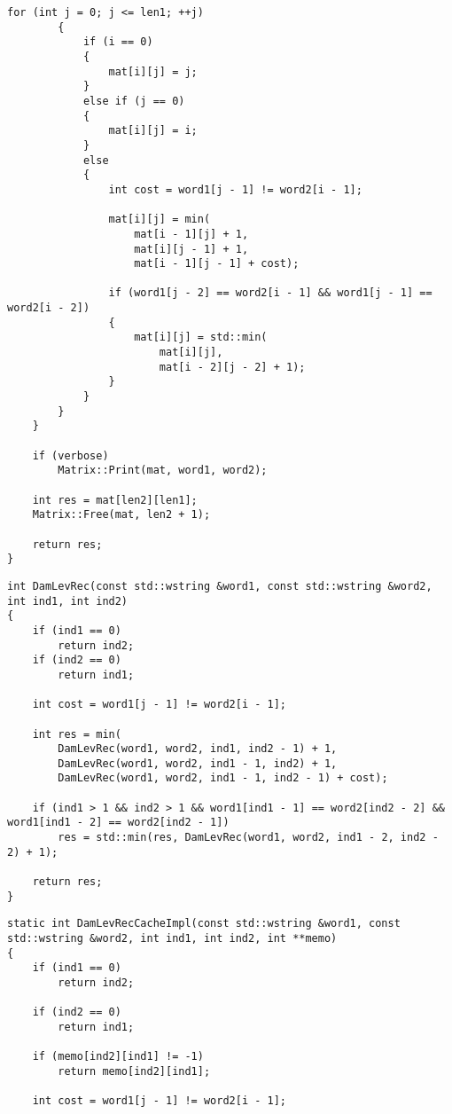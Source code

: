 \clearpage
\begin{lstlisting}[caption=Матричный алгоритм поиска расстояния Дамерау~---~Левенштейна (часть 2)]
        for (int j = 0; j <= len1; ++j)
        {
            if (i == 0)
            {
                mat[i][j] = j;
            }
            else if (j == 0)
            {
                mat[i][j] = i;
            }
            else
            {
                int cost = word1[j - 1] != word2[i - 1];

                mat[i][j] = min(
                    mat[i - 1][j] + 1,
                    mat[i][j - 1] + 1,
                    mat[i - 1][j - 1] + cost);

                if (word1[j - 2] == word2[i - 1] && word1[j - 1] == word2[i - 2])
                {
                    mat[i][j] = std::min(
                        mat[i][j],
                        mat[i - 2][j - 2] + 1);
                }
            }
        }
    }

    if (verbose)
        Matrix::Print(mat, word1, word2);

    int res = mat[len2][len1];
    Matrix::Free(mat, len2 + 1);

    return res;
}
\end{lstlisting}

\begin{lstlisting}[caption=Рекурсивный алгоритм поиска расстояния Дамерау~---~Левенштейна]
int DamLevRec(const std::wstring &word1, const std::wstring &word2, int ind1, int ind2)
{
    if (ind1 == 0)
        return ind2;
    if (ind2 == 0)
        return ind1;

    int cost = word1[j - 1] != word2[i - 1];

    int res = min(
        DamLevRec(word1, word2, ind1, ind2 - 1) + 1,
        DamLevRec(word1, word2, ind1 - 1, ind2) + 1,
        DamLevRec(word1, word2, ind1 - 1, ind2 - 1) + cost);

    if (ind1 > 1 && ind2 > 1 && word1[ind1 - 1] == word2[ind2 - 2] && word1[ind1 - 2] == word2[ind2 - 1])
        res = std::min(res, DamLevRec(word1, word2, ind1 - 2, ind2 - 2) + 1);

    return res;
}
\end{lstlisting}

\begin{lstlisting}[caption=Рекурсивный алгоритм поиска расстояния Дамерау~---~Левенштейна с кэшированием (реализация) (часть 1)]
static int DamLevRecCacheImpl(const std::wstring &word1, const std::wstring &word2, int ind1, int ind2, int **memo)
{
    if (ind1 == 0)
        return ind2;

    if (ind2 == 0)
        return ind1;

    if (memo[ind2][ind1] != -1)
        return memo[ind2][ind1];
    
    int cost = word1[j - 1] != word2[i - 1];
\end{lstlisting}

